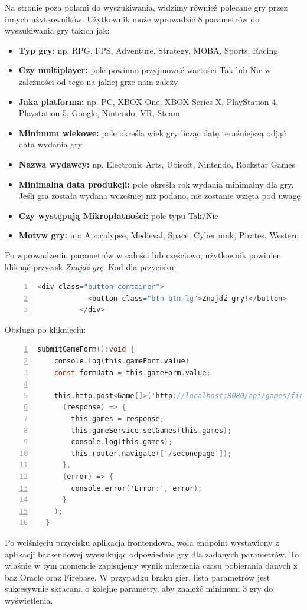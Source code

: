Na stronie poza polami do wyszukiwania, widzimy również polecane gry przez innych użytkowników. 
Użytkownik może wprowadzić 8 parametrów do wyszukiwania gry takich jak:
\begin{itemize}
\item \textbf{Typ gry:} np. RPG, FPS, Adventure, Strategy, MOBA, Sports, Racing
\item \textbf{Czy multiplayer:} pole powinno przyjmować wartości Tak lub Nie w zależności od tego na jakiej grze nam zależy
\item \textbf{Jaka platforma:} np. PC, XBOX One, XBOX Series X, PlayStation 4, Playstation 5, Google, Nintendo, VR, Steam
\item \textbf{Minimum wiekowe:} pole określa wiek gry licząc datę teraźniejszą odjąć data wydania gry
\item \textbf{Nazwa wydawcy:} np. Electronic Arts, Ubisoft, Nintendo, Rockstar Games
\item \textbf{Minimalna data produkcji:} pole określa rok wydania minimalny dla gry. Jeśli gra została wydana wcześniej niż podano, nie zostanie wzięta pod uwagę
\item \textbf{Czy występują Mikropłatności:} pole typu Tak/Nie
\item \textbf{Motyw gry:} np: Apocalypse, Medieval, Space, Cyberpunk, Pirates, Western
\end{itemize}
Po wprowadzeniu parametrów w całości lub częściowo, użytkownik powinien kliknąć przycisk \textit{Znajdź grę}.
Kod dla przycisku:
\begin{lstlisting}[language=C, mathescape, frame=single, numbers=left, xleftmargin=2em, framexleftmargin=2em, basicstyle=\ttfamily\bfseries, caption={Kod przycisku Znajdź gry}, label={Kod przycisku Znajdź gry}]
          <div class="button-container">
            <button class="btn btn-lg">Znajdź gry!</button>
          </div>
\end{lstlisting}
Obsługa po kliknięciu:
\begin{lstlisting}[language=C, mathescape, frame=single, numbers=left, xleftmargin=2em, framexleftmargin=2em, basicstyle=\ttfamily\bfseries, caption={Metoda wywoływana po wciśnięciu przycisku}, label={Metoda wywoływana po wciśnięciu przycisku}]
  submitGameForm():void {
    console.log(this.gameForm.value)
    const formData = this.gameForm.value;

    this.http.post<Game[]>('http://localhost:8080/api/games/findByCriteria', formData).subscribe(
      (response) => {
        this.games = response;
        this.gameService.setGames(this.games);
        console.log(this.games);
        this.router.navigate(['/secondpage']);
      },
      (error) => {
        console.error('Error:', error);
      }
    );
  }
\end{lstlisting}
Po wciśnięciu przycisku aplikacja frontendowa, woła endpoint wystawiony z aplikacji backendowej wyszukując odpowiednie gry dla zadanych parametrów. To właśnie w tym momencie zapisujemy wynik mierzenia czasu pobierania danych z baz Oracle oraz Firebase. W przypadku braku gier, lista parametrów jest sukcesywnie skracana o kolejne parametry, aby znaleźć minimum 3 gry do wyświetlenia.

